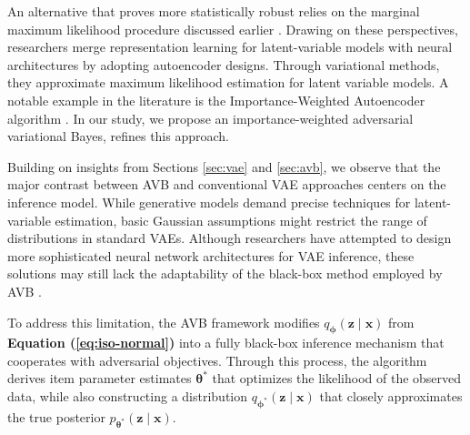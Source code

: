 \documentclass[a4paper,12pt]{article}
\theoremstyle{plain} %
\theoremstyle{remark} %
\theoremstyle{definition} %
\begin{document}
An alternative that proves more statistically robust relies on the marginal maximum likelihood procedure discussed earlier \citep{bock1981marginal,wirth2007item}. Drawing on these perspectives, researchers merge representation learning for latent-variable models with neural architectures by adopting autoencoder designs. Through variational methods, they approximate maximum likelihood estimation for latent variable models. A notable example in the literature is the Importance-Weighted Autoencoder algorithm \citep{urban2021deep}. In our study, we propose an importance-weighted adversarial variational Bayes, refines this approach.

Building on insights from Sections \ref{sec:vae} and \ref{sec:avb}, we observe that the major contrast between AVB and conventional VAE approaches centers on the inference model. While generative models demand precise techniques for latent-variable estimation, basic Gaussian assumptions might restrict the range of distributions in standard VAEs. Although researchers have attempted to design more sophisticated neural network architectures for VAE inference, these solutions may still lack the adaptability of the black-box method employed by AVB \citep{mescheder2017adversarial}. 

To address this limitation, the AVB framework modifies $q_{\bm{\phi}}(\bm{z}\mid\bm{x})$ from \textbf{Equation (\ref{eq:iso-normal})} into a fully black-box inference mechanism that cooperates with adversarial objectives. Through this process, the algorithm derives item parameter estimates $\bm{\theta}^*$ that optimizes the likelihood of the observed data, while also constructing a distribution $q_{\bm{\phi}^*}(\bm{z}\mid\bm{x})$ that closely approximates the true posterior $p_{\bm{\theta}^*}(\bm{z}\mid\bm{x})$. 
\end{document}
